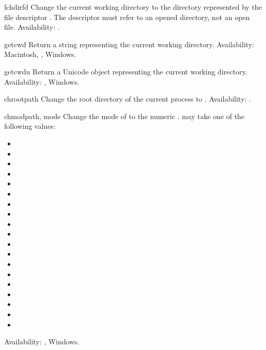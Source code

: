 \begin{funcdesc}{fchdir}{fd}
Change the current working directory to the directory represented by
the file descriptor .  The descriptor must refer to an opened
directory, not an open file.
Availability: \UNIX.
\end{funcdesc}

\begin{funcdesc}{getcwd}{}
Return a string representing the current working directory.
Availability: Macintosh, \UNIX, Windows.
\end{funcdesc}

\begin{funcdesc}{getcwdu}{}
Return a Unicode object representing the current working directory.
Availability: \UNIX, Windows.
\end{funcdesc}

\begin{funcdesc}{chroot}{path}
Change the root directory of the current process to .
Availability: \UNIX.
\end{funcdesc}

\begin{funcdesc}{chmod}{path, mode}
Change the mode of  to the numeric .
 may take one of the following values:
\begin{itemize}
  \item {}
  \item {}
  \item {}
  \item {}
  \item {}
  \item {}
  \item {}
  \item {}
  \item {}
  \item {}
  \item {}
  \item {}
  \item {}
  \item {}
  \item {}
  \item {}
  \item {}
  \item {}
  \item {}
\end{itemize}
Availability: \UNIX, Windows.
\end{funcdesc}

